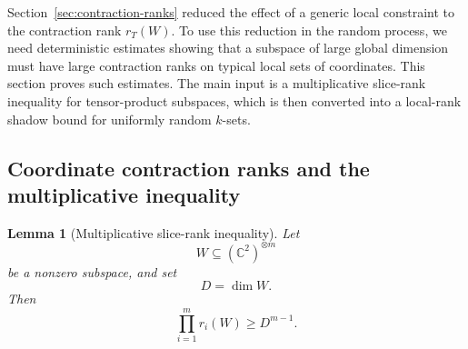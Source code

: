\documentclass[11pt]{article}
\newtheorem{lemma}{Lemma}
\begin{document}
Section~\ref{sec:contraction-ranks} reduced the effect of a generic local
constraint to the contraction rank \(r_T(W)\).  To use this reduction in the
random process, we need deterministic estimates showing that a subspace of
large global dimension must have large contraction ranks on typical local
sets of coordinates.  This section proves such estimates.  The main input is a
multiplicative slice-rank inequality for tensor-product subspaces, which is
then converted into a local-rank shadow bound for uniformly random \(k\)-sets.

\subsection{Coordinate contraction ranks and the multiplicative inequality}
\label{subsec:slice-rank-inequality}

\begin{lemma}[Multiplicative slice-rank inequality]
	\label{lem:multiplicative-slice-rank}
	Let
	\[
	W\subseteq(\mathbb C^2)^{\otimes m}
	\]
	be a nonzero subspace, and set
	\[
	D=\dim W.
	\]
	Then
	\[
	\prod_{i=1}^m r_i(W)\geq D^{m-1}.
	\]
\end{lemma}
\end{document}
